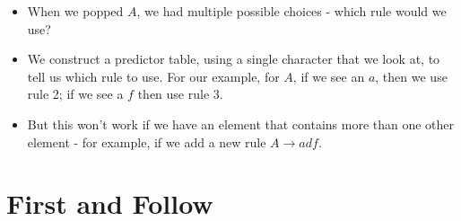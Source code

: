 \documentclass[12pt]{article}
\begin{document}
\begin{itemize}
\begin{itemize}
\begin{tabular}{c|c|c|c}
                \end{tabular}
            \item When we popped $A$, we had multiple possible choices - which rule would we use?
            \item We construct a predictor table, using a single character that we look at, to tell us which rule to use.  For our example, for $A$, if we see an $a$, then we use rule 2; if we see a $f$ then use rule 3.
            \item But this won't work if we have an element that contains more than one other element - for example, if we add a new rule $A \rightarrow adf$.
        \end{itemize}
\end{itemize}
\newpage

\section{First and Follow}
\end{document}
